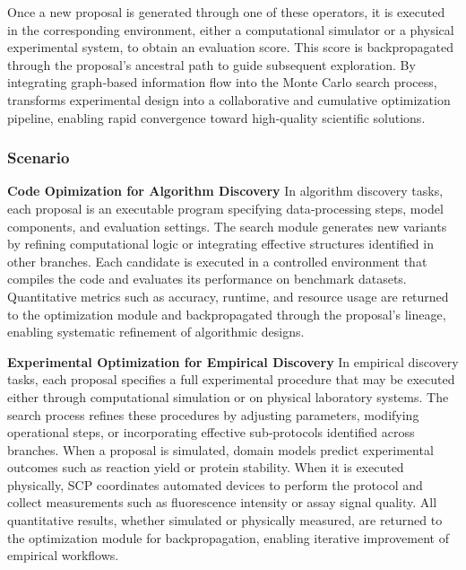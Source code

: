 Once a new proposal is generated through one of these operators, it is executed in the corresponding environment, either a computational simulator or a physical experimental system, to obtain an evaluation score. This score is backpropagated through the proposal’s ancestral path to guide subsequent exploration. By integrating graph‑based information flow into the Monte Carlo search process, {\ProjectName} transforms experimental design into a collaborative and cumulative optimization pipeline, enabling rapid convergence toward high‑quality scientific solutions.

\subsubsection{Scenario}
\noindent \textbf{Code Opimization for Algorithm Discovery}
In algorithm discovery tasks, each proposal is an executable program specifying data‑processing steps, model components, and evaluation settings. The search module generates new variants by refining computational logic or integrating effective structures identified in other branches. Each candidate is executed in a controlled environment that compiles the code and evaluates its performance on benchmark datasets. Quantitative metrics such as accuracy, runtime, and resource usage are returned to the optimization module and backpropagated through the proposal’s lineage, enabling systematic refinement of algorithmic designs.

\noindent \textbf{Experimental Optimization for Empirical Discovery}
In empirical discovery tasks, each proposal specifies a full experimental procedure that may be executed either through computational simulation or on physical laboratory systems. The search process refines these procedures by adjusting parameters, modifying operational steps, or incorporating effective sub‑protocols identified across branches. When a proposal is simulated, domain models predict experimental outcomes such as reaction yield or protein stability. When it is executed physically, SCP \cite{jiang2025scp} coordinates automated devices to perform the protocol and collect measurements such as fluorescence intensity or assay signal quality. All quantitative results, whether simulated or physically measured, are returned to the optimization module for backpropagation, enabling iterative improvement of empirical workflows.


